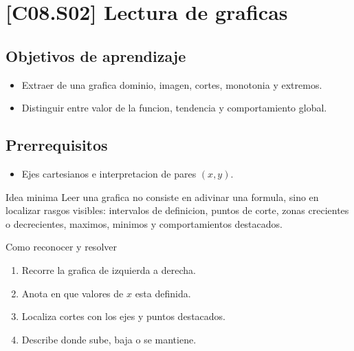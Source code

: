 \section{[C08.S02] Lectura de graficas}

\subsection*{Objetivos de aprendizaje}
\begin{itemize}
  \item Extraer de una grafica dominio, imagen, cortes, monotonia y extremos.
  \item Distinguir entre valor de la funcion, tendencia y comportamiento global.
\end{itemize}

\subsection*{Prerrequisitos}
\begin{itemize}
  \item Ejes cartesianos e interpretacion de pares \((x,y)\).
\end{itemize}

\begin{theorybox}{Idea minima}
Leer una grafica no consiste en adivinar una formula, sino en localizar rasgos visibles:
intervalos de definicion, puntos de corte, zonas crecientes o decrecientes, maximos, minimos y
comportamientos destacados.
\end{theorybox}

\begin{methodbox}{Como reconocer y resolver}
\begin{enumerate}
  \item Recorre la grafica de izquierda a derecha.
  \item Anota en que valores de \(x\) esta definida.
  \item Localiza cortes con los ejes y puntos destacados.
  \item Describe donde sube, baja o se mantiene.
\end{enumerate}
\end{methodbox}

